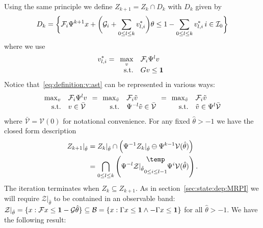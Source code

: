 %
Using the same principle we define $Z_{k+1}=Z_k\cap D_k$ with $D_k$ given by
%
\begin{equation}\label{eq:parametrised:Dk}\small
	D_k = \biggl\{\mathcal F_i\Psi^{k+1}x+ \biggl(\mathcal G_i +\sum_{0\leq l\leq k} v_{l,i}^\ast\biggr)\theta \leq 1 
	- \sum_{0\leq l\leq k} v_{l,i}^\ast\, i\in\mathcal I_0\biggr\}
\end{equation}
%
where we use 
%
\begin{equation}\label{eq:definition:v:ast}
v_{l,i}^\ast = \begin{array}[t]{rl}\displaystyle\max_v & \mathcal F_i \Psi^{l} v \\ \text{s.t.}& Gv\leq{\bf{1}}
\end{array}
\end{equation}
%
Notice that~\eqref{eq:definition:v:ast} can be represented in various ways:
\[
\begin{array}{@{}rl@{\hspace{0.7em}}c@{\hspace{0.7em}}rl@{\hspace{0.7em}}c@{\hspace{0.7em}}rl@{}}
\max_v&\mathcal F_i \Psi^l v &=& \max_{\tilde v}&\mathcal F_i \tilde  v &=& \max_{\tilde v}&\mathcal F_i \tilde v \\ 
\text{s.t.}&v\in\bar{\mathcal{V}} & & \text{s.t.}&\Psi^{-l} \tilde v\in\bar{\mathcal{V}} & &
\text{s.t.}& \tilde v\in\Psi^l\bar{\mathcal{V}}
\end{array}
\]
%
where $\bar{\mathcal{V}}=\mathcal V(0)$ for notational convenience. For any fixed $\hat\theta>-1$
we have the closed form description
%
\begin{equation}\label{eq:closed:form:parametrised:iterates}
\begin{split}
	Z_{k+1}\vert_{\hat\theta} &= Z_{k}\vert_{\hat\theta}\cap\left(
	\Psi^{-1}Z_k\vert_{\hat\theta}\ominus\Psi^{k-1}\mathcal V(\hat\theta)\right)\\
	&=\bigcap_{0\leq l\leq k}\left(\Psi^{-l}\mathcal Z\vert_{\hat\theta}\underset{0\leq i\leq l-1}{\bigominus} 
	\Psi^i \mathcal V(\hat\theta)
	\right).
\end{split}
\end{equation}
%
The iteration terminates when $Z_k\subseteq Z_{k+1}$. As in section~\ref{sec:state:dep:MRPI}
we will require $\mathcal Z\vert_{\hat\theta}$ to be contained in an observable band: $\mathcal Z\vert_{\hat\theta}
=\{x:\mathcal Fx \leq {\bf{1}}-\mathcal G\hat\theta\}\subseteq \mathcal B=\{x:\Gamma x\leq {\bf{1}}\wedge -\Gamma 
x\leq {\bf{1}}\}$ for all $\hat\theta>-1$. We have the following result:
